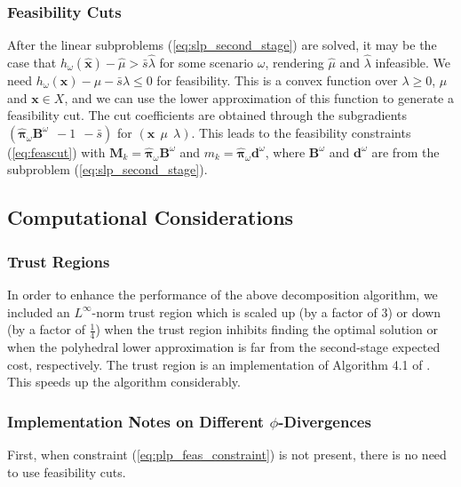 \documentclass[opre,nonblindrev]{informs3} %
\newcommand{\x}{\mathbf{x}}
\newcommand{\xh}{\hat{\x}}
\newcommand{\lh}{\hat{\lambda}}
\newcommand{\mh}{\hat{\mu}}
\newcommand{\bpi}{\mathbf{\pi}}
\newcommand{\bpih}{\hat{\bpi}}
\newcommand{\B}{\mathbf{B}}
\renewcommand{\d}{\mathbf{d}}
\newcommand{\M}{\mathbf{M}}
\begin{document}
\subsubsection{Feasibility Cuts}

After the linear subproblems (\ref{eq:slp_second_stage}) are solved, it may be the case that $h_\omega(\xh) - \mh > \bar{s} \lh$ for some scenario $\omega$, rendering $\mh$ and $\lh$ infeasible.
We need $h_\omega(\x) - \mu - \bar{s}\lambda \leq 0$ for feasibility. 
This is a convex function over $\lambda \geq 0$, $\mu$ and $\x \in X$, and we can use the lower approximation of this function to generate a feasibility cut. 
The cut coefficients are obtained through the subgradients $(\hat{\bpi}_\omega \B^\omega \ \ -1 \ \ -\bar{s} )$ for $(\x\ \ \mu\ \ \lambda)$.  
This leads to the feasibility constraints (\ref{eq:feascut}) with $\M_k = \bpih_\omega \B^\omega$ and $m_k =\bpih_\omega \d^\omega$, where $\B^\omega$ and $\d^\omega$ are from the subproblem (\ref{eq:slp_second_stage}).


\subsection{Computational Considerations}
\label{ssec:computcons}

\subsubsection{Trust Regions}

In order to enhance the performance of the above decomposition algorithm, we included an $L^\infty$-norm trust region which is scaled up (by a factor of $3$) or down (by a factor of $\tfrac{1}{4}$) when the trust region inhibits finding the optimal solution or when the polyhedral lower approximation is far from the second-stage expected cost, respectively.
The trust region is an implementation of Algorithm 4.1 of \cite{nocedal1999numerical}.
This speeds up the algorithm considerably. 

\subsubsection{Implementation Notes on Different $\phi$-Divergences}
\label{ssec:implement}

First, when constraint (\ref{eq:plp_feas_constraint}) is not present, there is no need to use feasibility cuts. 
\end{document}

